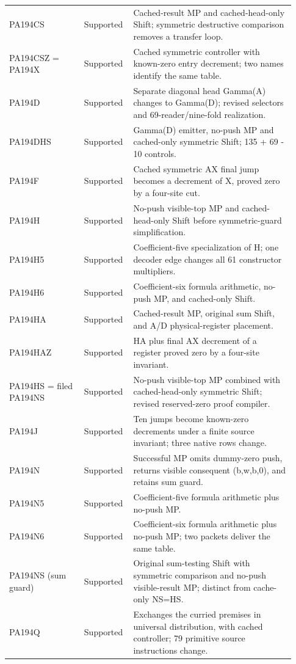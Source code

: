 \begin{longtable}{@{}p{0.25\linewidth}p{0.14\linewidth}p{0.54\linewidth}@{}}
PA194CS & Supported & Cached-result MP and cached-head-only Shift; symmetric destructive comparison removes a transfer loop. \\
PA194CSZ = PA194X & Supported & Cached symmetric controller with known-zero entry decrement; two names identify the same table. \\
PA194D & Supported & Separate diagonal head Gamma(A) changes to Gamma(D); revised selectors and 69-reader/nine-fold realization. \\
PA194DHS & Supported & Gamma(D) emitter, no-push MP and cached-only symmetric Shift; 135 + 69 - 10 controls. \\
PA194F & Supported & Cached symmetric AX final jump becomes a decrement of X, proved zero by a four-site cut. \\
PA194H & Supported & No-push visible-top MP and cached-head-only Shift before symmetric-guard simplification. \\
PA194H5 & Supported & Coefficient-five specialization of H; one decoder edge changes all 61 constructor multipliers. \\
PA194H6 & Supported & Coefficient-six formula arithmetic, no-push MP, and cached-only Shift. \\
PA194HA & Supported & Cached-result MP, original sum Shift, and A/D physical-register placement. \\
PA194HAZ & Supported & HA plus final AX decrement of a register proved zero by a four-site invariant. \\
PA194HS = filed PA194NS & Supported & No-push visible-top MP combined with cached-head-only symmetric Shift; revised reserved-zero proof compiler. \\
PA194J & Supported & Ten jumps become known-zero decrements under a finite source invariant; three native rows change. \\
PA194N & Supported & Successful MP omits dummy-zero push, returns visible consequent (b,w,b,0), and retains sum guard. \\
PA194N5 & Supported & Coefficient-five formula arithmetic plus no-push MP. \\
PA194N6 & Supported & Coefficient-six formula arithmetic plus no-push MP; two packets deliver the same table. \\
PA194NS (sum guard) & Supported & Original sum-testing Shift with symmetric comparison and no-push visible-result MP; distinct from cache-only NS=HS. \\
PA194Q & Supported & Exchanges the curried premises in universal distribution, with cached controller; 79 primitive source instructions change. \\

\end{longtable}
